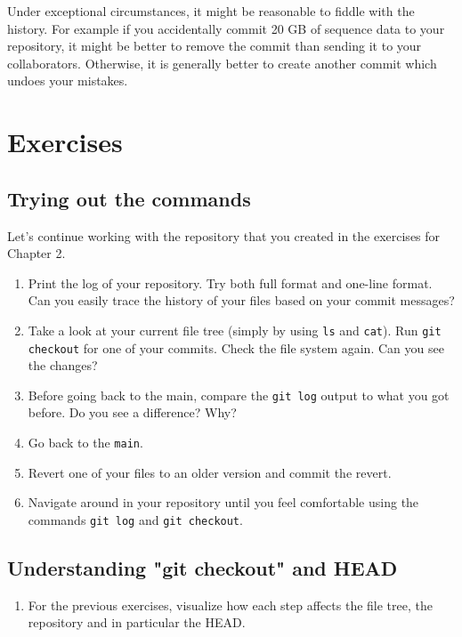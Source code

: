 \documentclass[../main/git_course_main.tex]{subfiles}
\begin{document}
	Under exceptional circumstances, it might be reasonable to fiddle with the history. For example if you accidentally commit 20 GB of sequence data
	to your repository, it might be better to remove the commit than sending it to your collaborators. Otherwise, it is generally better
	to create another commit which undoes your mistakes.
	
	\newpage
	\section{Exercises}
	
	\subsection{Trying out the commands}
	
	Let's continue working with the repository that you created in the exercises for Chapter 2.
	
	\begin{enumerate}
		\item Print the log of your repository. Try both full format and one-line format. Can you easily trace the history of your files based on your commit messages?
		\item Take a look at your current file tree (simply by using \verb$ls$ and \verb$cat$). Run \verb$git checkout$ for one of your commits. Check the file system again. Can you see the changes?
		\item Before going back to the main, compare the \verb$git log$ output to what you got before. Do you see a difference? Why?
		\item Go back to the \verb$main$.
		\item Revert one of your files to an older version and commit the revert.
		\item Navigate around in your repository until you feel comfortable using the commands \verb$git log$ and \verb$git checkout$.
	\end{enumerate}
	
	\subsection{Understanding "git checkout" and HEAD}
	
	\begin{enumerate}
		\item For the previous exercises, visualize how each step affects the file tree, the repository and in particular the HEAD.
	\end{enumerate}
	
\end{document}
